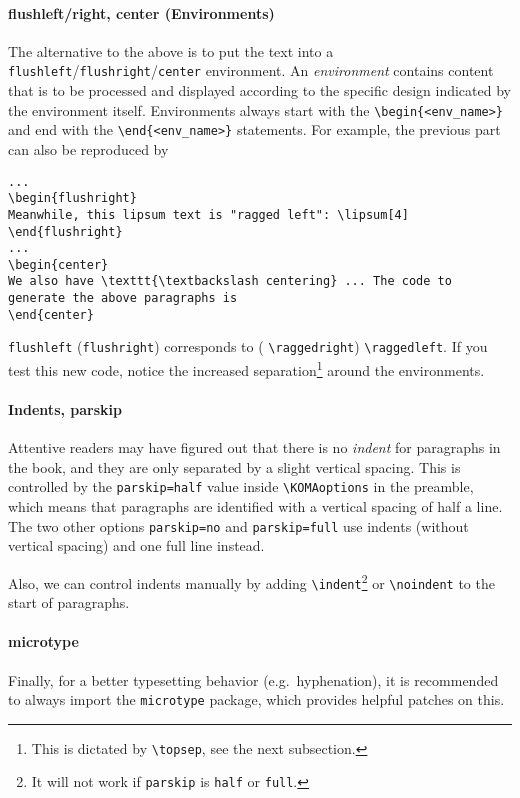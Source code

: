 \paragraph{flushleft/right, center (Environments)}
The alternative to the above is to put the text into a \verb|flushleft|/\verb|flushright|/\verb|center| environment. An \textit{environment} contains content that is to be processed and displayed according to the specific design indicated by the environment itself. Environments always start with the \texttt{\textbackslash begin\{<env\_name>\}} and end with the \texttt{\textbackslash end\{<env\_name>\}} statements. For example, the previous part can also be reproduced by
\begin{lstlisting}
...
\begin{flushright}
Meanwhile, this lipsum text is "ragged left": \lipsum[4]
\end{flushright}
...
\begin{center}
We also have \texttt{\textbackslash centering} ... The code to generate the above paragraphs is
\end{center}
\end{lstlisting}
\texttt{flushleft} (\texttt{flushright}) corresponds to ( \texttt{\textbackslash raggedright}) \texttt{\textbackslash raggedleft}. If you test this new code, notice the increased separation\footnote{This is dictated by \texttt{\textbackslash topsep}, see the next subsection.} around the environments. 

\paragraph{Indents, parskip}
Attentive readers may have figured out that there is no \textit{indent} for paragraphs in the book, and they are only separated by a slight vertical spacing. This is controlled by the \verb|parskip=half| value inside \texttt{\textbackslash KOMAoptions} in the preamble, which means that paragraphs are identified with a vertical spacing of half a line. The two other options \verb|parskip=no| and \verb|parskip=full| use indents (without vertical spacing) and one full line instead. 

Also, we can control indents manually by adding \texttt{\textbackslash indent}\footnote{It will not work if \texttt{parskip} is \texttt{half} or \texttt{full}.} or \texttt{\textbackslash noindent} to the start of paragraphs.

\paragraph{microtype}
Finally, for a better typesetting behavior (e.g.\ hyphenation), it is recommended to always import the \verb|microtype| package, which provides helpful patches on this.

